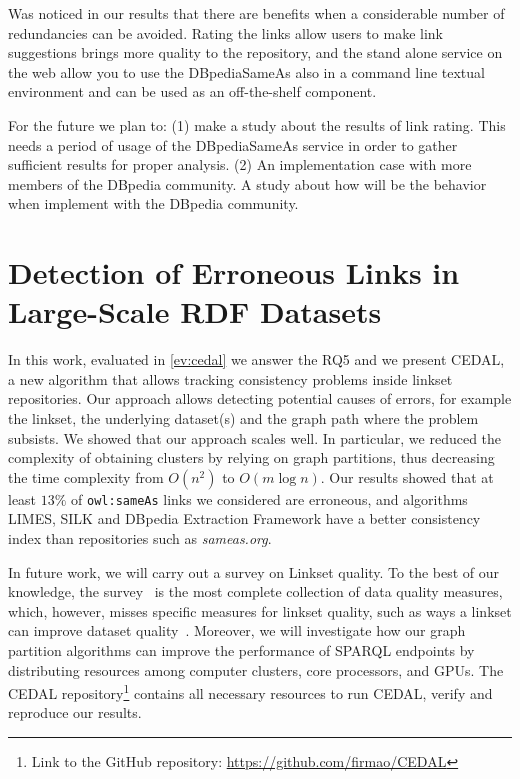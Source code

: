 Was noticed in our results that there are benefits when a considerable number of  redundancies can be avoided. Rating the links allow users to make link suggestions brings more quality to the repository, and the stand alone service on the web allow you to use the DBpediaSameAs also in a command line textual environment and can be used as an off-the-shelf component.

For the future we plan to:
(1) make a study about the results of link rating. This needs a period of usage of the DBpediaSameAs service in order to gather sufficient results for proper analysis.
(2) An implementation case with more members of the DBpedia community. A study about how will be the behavior when implement with the DBpedia community.

\section{Detection of Erroneous Links in Large-Scale RDF Datasets}
In this work, evaluated in \ref{ev:cedal} we answer the RQ5 and we present CEDAL, a new algorithm that allows tracking consistency problems inside linkset repositories. Our approach allows detecting potential causes of errors, for example the linkset, the underlying dataset(s) and the graph path where the problem subsists.
We showed that our approach scales well. In particular, we reduced the complexity of obtaining clusters by relying on graph partitions, thus decreasing the time complexity from $O(n^2)$ to $O(m \log n)$.
Our results showed that at least $13\%$ of \texttt{owl:sameAs} links we considered are erroneous, and algorithms LIMES, SILK and DBpedia Extraction Framework have a better consistency index than repositories such as \emph{sameas.org}. %

In future work, we will carry out a survey on Linkset quality. To the best of our knowledge, the survey~\cite{zaveri2015quality} is the most complete collection of data quality measures, which, however, misses specific measures for linkset quality, such as ways a linkset can improve dataset quality~\cite{Albertoni:2013:ALQ:2457317.2457327,yaghouti2015metric,casanova2014materialized}.
Moreover, we will investigate how our graph partition algorithms can improve the performance of SPARQL endpoints by distributing resources among computer clusters, core processors, and GPUs.
The CEDAL repository\footnote{Link to the GitHub repository: \url{https://github.com/firmao/CEDAL}} contains all necessary resources to run CEDAL, verify and reproduce our results.


